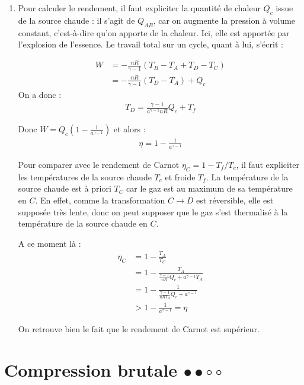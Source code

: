 \begin{correction}
\begin{enumerate}
 \item  Pour calculer le rendement, il faut expliciter la quantité de chaleur $Q_c$ issue de la source chaude : il s'agit de $Q_{AB}$, car on augmente la pression à volume constant, c'est-à-dire qu'on apporte de la chaleur. Ici, elle est apportée par l'explosion de l'essence. Le travail total sur un cycle, quant à lui, s'écrit :

\begin{align*}
	W &= -\frac{nR}{\gamma-1}(T_B-T_A+T_D-T_C)\\
	&=-\frac{nR}{\gamma-1}(T_D-T_A) + Q_c
\end{align*}
On a donc :
\begin{align*}
	T_D = \frac{\gamma-1}{a^{\gamma-1}nR}Q_c+T_f
\end{align*}

Donc $W=Q_c\left( 1-\frac{1}{a^{\gamma-1}}\right) $ et alors :
\begin{align*}
	\eta= 1-\frac{1}{a^{\gamma-1}}
\end{align*}

	Pour comparer avec le rendement de Carnot $\eta_C=1-T_f/T_c$, il faut expliciter les températures de la source chaude $T_c$ et froide $T_f$. La température de la source chaude est à priori $T_C$ car le gaz est au maximum de sa température en $C$. En effet, comme la transformation $C\longrightarrow D$ est réversible, elle est supposée très lente, donc on peut supposer que le gaz s'est thermalisé à la température de la source chaude en $C$. 
	
	A ce moment là :
	\begin{align*}
		\eta_C&=1-\frac{T_A}{T_C}\\
		&=1-\frac{T_A}{\frac{\gamma-1}{nR}Q_c+a^{\gamma-1}T_A}\\
		&=1-\frac{1}{\frac{\gamma-1}{nRT_A}Q_c+a^{\gamma-1}}\\
		&>1-\frac{1}{a^{\gamma-1}} = \eta
	\end{align*}

On retrouve bien le fait que le rendement de Carnot est supérieur.

\end{enumerate}

\end{correction}

\newpage

\section{Compression brutale $\bullet\bullet\circ\circ$}


